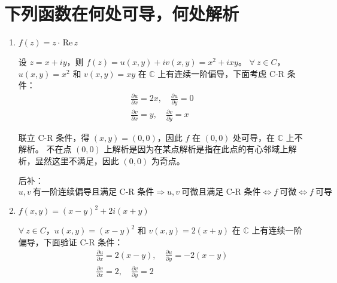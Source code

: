 \documentclass[UTF8]{report}
\def\Re{\mathrm{\,Re\,}}
\def\C{\mathbb{C}}
\theoremstyle{MyLineTheoremStyle} %
\theoremstyle{MyBlockTheoremStyle} %
\theoremstyle{MySubsubsectionStyle} %
\begin{document}
\section{下列函数在何处可导，何处解析}
\begin{enumerate}
\item $ f(z) = z\cdot \Re z$

设 $z = x + iy$，则 $f(z) = u(x,y) + iv(x,y) = x^2 + ixy$。
$\forall\  z \in C$，$u(x,y) = x^2$ 和 $v(x,y) = xy$ 在 $\C$ 上有连续一阶偏导，下面考虑 C-R 条件：
\begin{gather}
\frac{\partial u }{\partial x } = 2x, \quad \frac{\partial u }{\partial y } = 0 \\ 
\frac{\partial v }{\partial x } = y, \quad \frac{\partial v }{\partial y } = x
\end{gather}

联立 C-R 条件，得 $(x,y) = (0,0)$，因此 $f$ 在 $(0,0)$ 处可导，在 $\C$ 上不解析。
不在点 $(0,0)$ 上解析是因为在某点解析是指在此点的有心邻域上解析，显然这里不满足，因此 $(0,0)$ 为奇点。


{\par\color{gray}\small
后补：
\begin{equation*}
u,v\ \text{有一阶连续偏导且满足 C-R 条件} \Longrightarrow  u,v\ \text{可微且满足 C-R 条件} \Longleftrightarrow f\ \text{可微} \Longleftrightarrow 
f\ \text{可导}
\end{equation*}
\par}



\item $f(x,y) = (x-y)^2 + 2i(x+y)$

$\forall\  z \in C$，$u(x,y) = (x-y)^2$ 和 $v(x,y) = 2(x+y)$ 在 $\C$ 上有连续一阶偏导，下面验证 C-R 条件：
\begin{gather}
\frac{\partial u }{\partial x } = 2(x-y), \quad \frac{\partial u }{\partial y } = -2(x-y) \\ 
\frac{\partial v }{\partial x } = 2, \quad \frac{\partial v }{\partial y } = 2
\end{gather}


\end{enumerate}
\end{document}
